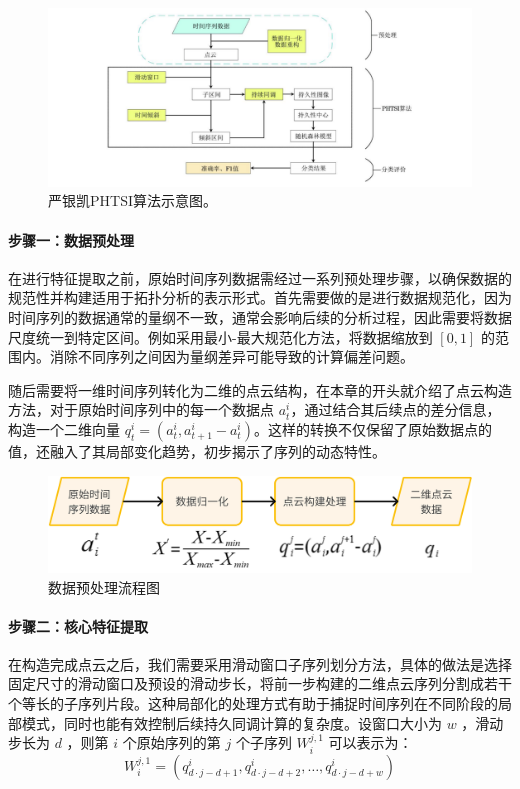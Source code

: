 \begin{figure}[thbp!]
    \centering
    \includegraphics[width=1.0\textwidth]{figure/严银凯示意图.png}
    \caption{严银凯PHTSI算法示意图。}
\end{figure}


\paragraph*{步骤一：数据预处理}
在进行特征提取之前，原始时间序列数据需经过一系列预处理步骤，以确保数据的规范性并构建适用于拓扑分析的表示形式。首先需要做的是进行数据规范化，因为时间序列的数据通常的量纲不一致，通常会影响后续的分析过程，因此需要将数据尺度统一到特定区间。例如采用最小-最大规范化方法，将数据缩放到 $[0, 1]$ 的范围内。消除不同序列之间因为量纲差异可能导致的计算偏差问题。

随后需要将一维时间序列转化为二维的点云结构，在本章的开头就介绍了点云构造方法，对于原始时间序列中的每一个数据点 $a_t^i$，通过结合其后续点的差分信息，构造一个二维向量 $q_t^i = (a_t^i, a_{t+1}^i - a_t^i)$。这样的转换不仅保留了原始数据点的值，还融入了其局部变化趋势，初步揭示了序列的动态特性。
\begin{figure}[thbp!]
    \centering
    \includegraphics[width=1.0\textwidth]{figure/数据预处理流程图.png}
    \caption{数据预处理流程图}
\end{figure}

\paragraph*{步骤二：核心特征提取}
在构造完成点云之后，我们需要采用滑动窗口子序列划分方法，具体的做法是选择固定尺寸的滑动窗口及预设的滑动步长，将前一步构建的二维点云序列分割成若干个等长的子序列片段。这种局部化的处理方式有助于捕捉时间序列在不同阶段的局部模式，同时也能有效控制后续持久同调计算的复杂度。设窗口大小为 $w$ ，滑动步长为 $d$ ，则第 $i$ 个原始序列的第 $j$ 个子序列 $W_i^{j, 1}$ 可以表示为：
\begin{equation}
    W_i^{j, 1}=\left(q_{d \cdot j-d+1}^i, q_{d \cdot j-d+2}^i, \ldots, q_{d \cdot j-d+w}^i\right)
\end{equation}

